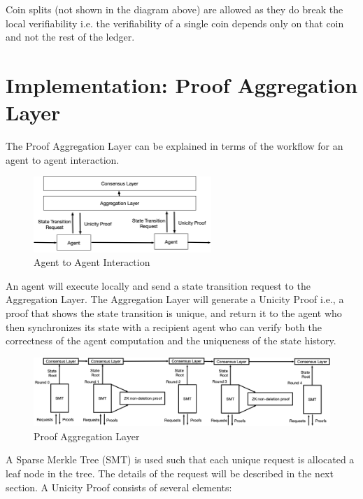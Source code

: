 \documentclass{article}
\begin{document}
Coin splits (not shown in the diagram above) are allowed as they do break the local verifiability i.e. the verifiability of a single coin depends only on that coin and not the rest of the ledger.


\section{Implementation: Proof Aggregation Layer}

The Proof Aggregation Layer can be explained in terms of the workflow for an agent to agent interaction. 

\begin{figure}[H]
    \centering
    \includegraphics[width=0.6\textwidth]{Workflow.png}
    \caption{Agent to Agent Interaction}
    \label{fig:Workflow}
\end{figure}


An agent will execute locally and send a state transition request to the Aggregation Layer. The Aggregation Layer will generate a Unicity Proof i.e., a proof that shows the state transition is unique, and return it to the agent who then synchronizes its state with a recipient agent who can verify both the correctness of the agent computation and the uniqueness of the state history.

\vspace{2mm}

\begin{figure}[htbp]
    \centering
    \includegraphics[width=1\textwidth]{SMT.png}
    \caption{Proof Aggregation Layer}
    \label{fig:SMT}
\end{figure}


 A Sparse Merkle Tree (SMT) is used such that each unique request is allocated a leaf node in the tree. The details of the request will be described in the next section. A Unicity Proof consists of several elements:
 
\end{document}

